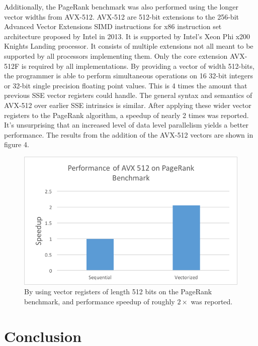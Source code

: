 \documentclass[conference]{IEEEtran}
\begin{document}
Additionally, the PageRank benchmark was also performed using the longer vector widths from AVX-512.  AVX-512 are 512-bit extensions to the 256-bit Advanced Vector Extensions SIMD instructions for x86 instruction set architecture proposed by Intel in 2013.  It is supported by Intel's Xeon Phi x200 Knights Landing processor.  It consists of multiple extensions not all meant to be supported by all processors implementing them.  Only the core extension AVX-512F is required by all implementations.  By providing a vector of width 512-bits, the programmer is able to perform simultaneous operations on 16 32-bit integers or 32-bit single precision floating point values.  This is 4 times the amount that previous SSE vector registers could handle.  The general syntax and semantics of AVX-512 over earlier SSE intrinsics is similar.  After applying these wider vector registers to the PageRank algorithm, a speedup of nearly 2 times was reported.  It's unsurprising that an increased level of data level parallelism yields a better performance.  The results from the addition of the AVX-512 vectors are shown in figure 4.  

\begin{figure}
\includegraphics[scale=0.7]{figures/benchmark_avx.png}
\caption{By using vector registers of length 512 bits on the PageRank benchmark, and performance speedup of roughly $2 \times$ was reported.  }
\end{figure}

\section{Conclusion}
\end{document}
